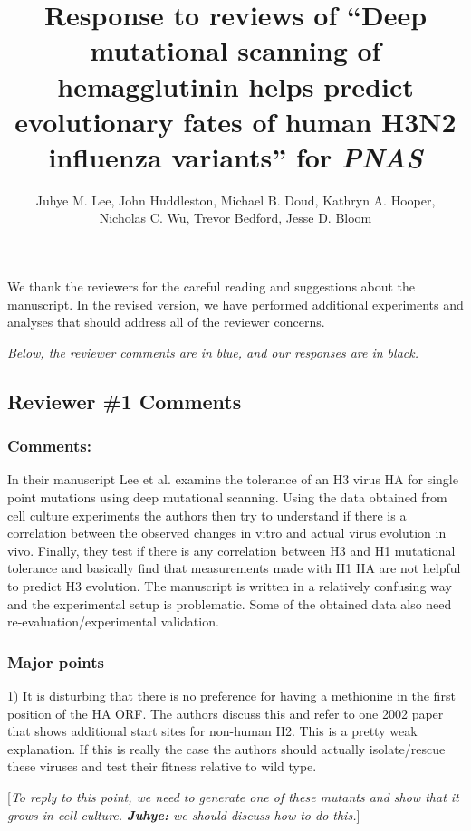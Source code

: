 \documentclass[11pt, oneside]{article}   	%
\title{Response to reviews of ``Deep mutational scanning of hemagglutinin helps predict evolutionary fates of human H3N2 influenza variants'' for \textit{PNAS}}
\author{Juhye M. Lee, John Huddleston, Michael B. Doud, Kathryn A. Hooper,\\Nicholas C. Wu, Trevor Bedford, Jesse D. Bloom}
\newcommand{\comment}[1]{{\color{red}[\textsl{#1}]}}
\begin{document}
\maketitle

We thank the reviewers for the careful reading and suggestions about the manuscript.
In the revised version, we have performed additional experiments and analyses that should address all of the reviewer concerns.

\emph{Below, the reviewer comments {\color{blue} are in blue}, and our responses are in black.}

\color{blue}

\subsection*{Reviewer \#1 Comments}

\subsubsection*{Comments:} 
In their manuscript Lee et al. examine the tolerance of an H3 virus HA for single point mutations using deep mutational scanning. Using the data obtained from cell culture experiments the authors then try to understand if there is a correlation between the observed changes in vitro and actual virus evolution in vivo. Finally, they test if there is any correlation between H3 and H1 mutational tolerance and basically find that measurements made with H1 HA are not helpful to predict H3 evolution. The manuscript is written in a relatively confusing way and the experimental setup is problematic. Some of the obtained data also need re-evaluation/experimental validation. 

\subsubsection*{Major points} 

1) It is disturbing that there is no preference for having a methionine in the first position of the HA ORF. The authors discuss this and refer to one 2002 paper that shows additional start sites for non-human H2. This is a pretty weak explanation. If this is really the case the authors should actually isolate/rescue these viruses and test their fitness relative to wild type. 

\comment{To reply to this point, we need to generate one of these mutants and show that it grows in cell culture.
{\bf Juhye:} we should discuss how to do this.}
\end{document}
